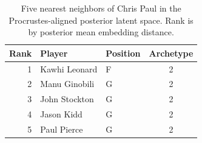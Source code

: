 \begin{table}[htbp]
  \centering\small
  \begin{tabular}{rllc}
    \toprule
    Rank & Player & Position & Archetype \\
    \midrule
    1 & Kawhi Leonard & F & 2 \\
    2 & Manu Ginobili & G & 2 \\
    3 & John Stockton & G & 2 \\
    4 & Jason Kidd & G & 2 \\
    5 & Paul Pierce & G & 2 \\
    \bottomrule
  \end{tabular}
  \caption{Five nearest neighbors of Chris Paul in the Procrustes-aligned posterior latent space. Rank is by posterior mean embedding distance.}
\end{table}

